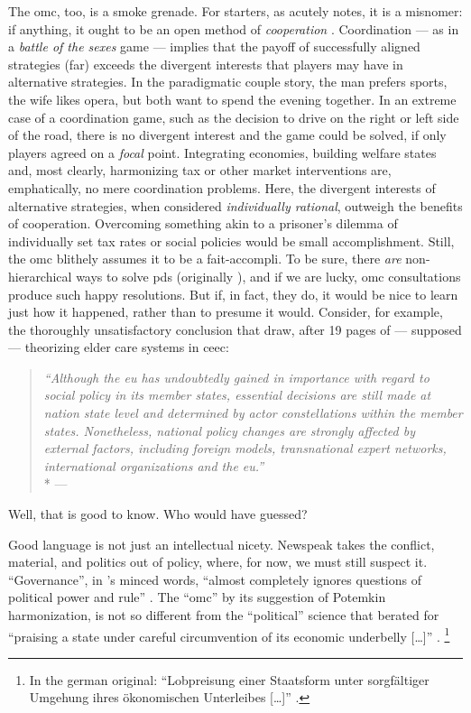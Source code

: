 The \gls{omc}, too, is a smoke grenade.
For starters, as \citeauthor{Offe2003} acutely notes, it is a misnomer:
if anything, it ought to be an open method of \emph{cooperation} \citeyearpar[467]{Offe2003}.
Coordination --- as in a \emph{battle of the sexes} game --- implies that the payoff of successfully aligned strategies (far) exceeds the divergent interests that players may have in alternative strategies.
In the paradigmatic couple story, the man prefers sports, the wife likes opera, but both want to spend the evening together.
In an extreme case of a coordination game, such as the decision to drive on the right or left side of the road, there is no divergent interest and the game could be solved, if only players agreed on a \emph{focal} point.
Integrating economies, building welfare states and, most clearly, harmonizing tax or other market interventions are, emphatically, no mere coordination problems.
Here, the divergent interests of alternative strategies, when considered \emph{individually rational}, outweigh the benefits of cooperation.
Overcoming something akin to a prisoner's dilemma of individually set tax rates or social policies would be small accomplishment.
Still, the \gls{omc} blithely assumes it to be a fait-accompli.
To be sure, there \emph{are} non-hierarchical ways to solve \glspl{pd} (originally \citealt{Axelrod1980}), and if we are lucky, \gls{omc} consultations produce such happy resolutions.
But if, in fact, they do, it would be nice to learn just how it happened, rather than to presume it would.
Consider, for example, the thoroughly unsatisfactory conclusion that \citeauthor{Theobald2009} draw, after 19 pages of --- supposed --- theorizing elder care systems in \gls{ceec}:

\begin{quote}
	\emph{``Although the \gls{eu} has undoubtedly gained in importance with regard to social policy in its member states, essential decisions are still made at nation state level and determined by actor constellations within the member states.
	Nonetheless, national policy changes are strongly affected by external factors, including foreign models, transnational expert networks, international organizations and the \gls{eu}.''}
	\\*
	--- \citet[163]{Theobald2009}
\end{quote}

Well, that is good to know.
Who would have guessed?

Good language is not just an intellectual nicety.
Newspeak takes the conflict, material, and politics out of policy, where, for now, we must still suspect it.
``Governance'', in \citeauthor{Jachtenfuchs2001}'s minced words, ``almost completely ignores questions of political power and rule'' \citeyearpar[258]{Jachtenfuchs2001}.
The ``\gls{omc}'' by its suggestion of Potemkin harmonization, is not so different from the ``political'' science that \cite{Agnoli-1989-aa} berated for ``praising a state under careful circumvention of its economic underbelly [\ldots]'' \citeyearpar[195]{Agnoli-1989-aa}.
\footnote{
	In the german original:
	``Lobpreisung einer Staatsform unter sorgfältiger Umgehung ihres ökonomischen Unterleibes [\ldots]'' \citep[195]{Agnoli-1989-aa}.
}

